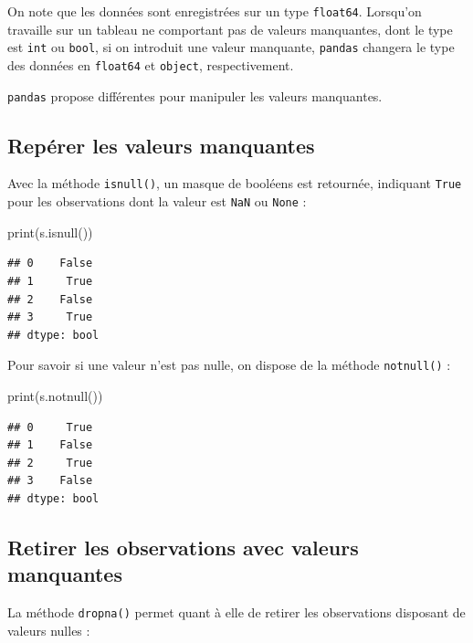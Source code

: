 \documentclass[12pt,]{book}
\newenvironment{Shaded}{\begin{snugshade}}{\end{snugshade}}
\newcommand{\BuiltInTok}[1]{#1}
\newcommand{\NormalTok}[1]{#1}
\numberwithin{equation}{section}
\numberwithin{countremarque}{section}
\let\BeginKnitrBlock\begin \let\EndKnitrBlock\end
\begin{document}
\BeginKnitrBlock{remarque}
On note que les données sont enregistrées sur un type \texttt{float64}.
Lorsqu'on travaille sur un tableau ne comportant pas de valeurs
manquantes, dont le type est \texttt{int} ou \texttt{bool}, si on
introduit une valeur manquante, \texttt{pandas} changera le type des
données en \texttt{float64} et \texttt{object}, respectivement.
\EndKnitrBlock{remarque}

\texttt{pandas} propose différentes pour manipuler les valeurs
manquantes.

\subsection{Repérer les valeurs
manquantes}\label{reperer-les-valeurs-manquantes}

Avec la méthode \texttt{isnull()}, un masque de booléens est retournée,
indiquant \texttt{True} pour les observations dont la valeur est
\texttt{NaN} ou \texttt{None} :

\begin{Shaded}
\begin{Highlighting}[]
\BuiltInTok{print}\NormalTok{(s.isnull())}
\end{Highlighting}
\end{Shaded}

\begin{lstlisting}
## 0    False
## 1     True
## 2    False
## 3     True
## dtype: bool
\end{lstlisting}

Pour savoir si une valeur n'est pas nulle, on dispose de la méthode
\texttt{notnull()} :

\begin{Shaded}
\begin{Highlighting}[]
\BuiltInTok{print}\NormalTok{(s.notnull())}
\end{Highlighting}
\end{Shaded}

\begin{lstlisting}
## 0     True
## 1    False
## 2     True
## 3    False
## dtype: bool
\end{lstlisting}

\subsection{Retirer les observations avec valeurs
manquantes}\label{retirer-les-observations-avec-valeurs-manquantes}

La méthode \texttt{dropna()} permet quant à elle de retirer les
observations disposant de valeurs nulles :
\end{document}

